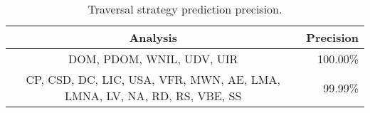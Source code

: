 \begin{table}
\footnotesize
\centering
\caption{Traversal strategy prediction precision.}
\setlength{\tabcolsep}{2pt}
\begin{tabular}{cr}
\toprule
Analysis & Precision \\
\midrule
DOM, PDOM, WNIL, UDV, UIR & 100.00\% \\
CP, CSD, DC, LIC, USA, VFR, MWN, AE, LMA, LMNA, LV, NA, RD, RS, VBE, SS  & 99.99\% \\
\bottomrule
\end{tabular}%
\label{tab:prediction-precision}%
\end{table}%